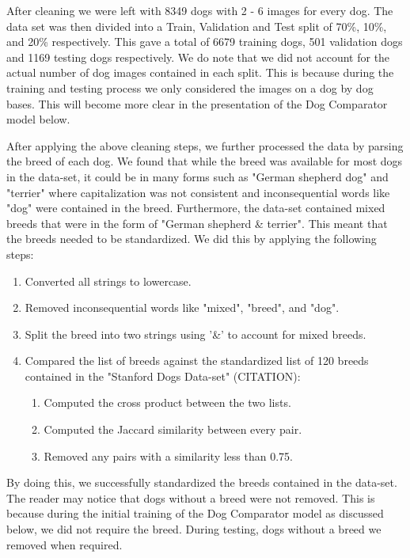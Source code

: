 \documentclass{article}
\begin{document}
\noindent After cleaning we were left with 8349 dogs with 2 - 6 images for every dog.  The data set was then divided into a Train, Validation and Test split of 70\%, 10\%, and 20\% respectively.  This gave a total of 6679 training dogs, 501 validation dogs and 1169 testing dogs respectively.  We do note that we did not account for the actual number of dog images contained in each split.  This is because during the training and testing process we only considered the images on a dog by dog bases.  This will become more clear in the presentation of the Dog Comparator model below.

After applying the above cleaning steps, we further processed the data by parsing the breed of each dog.  We found that while the breed was available for most dogs in the data-set, it could be in many forms such as "German shepherd dog" and "terrier" where capitalization was not consistent and inconsequential words like "dog" were contained in the breed.  Furthermore, the data-set contained mixed breeds that were in the form of "German shepherd \& terrier".  This meant that the breeds needed to be standardized.  We did this by applying the following steps:

\begin{enumerate}
  \item Converted all strings to lowercase.
  
  \item Removed inconsequential words like "mixed", "breed", and "dog".
  
  \item Split the breed into two strings using '\&' to account for mixed breeds.
    
  \item Compared the list of breeds against the  standardized list of 120 breeds contained in the "Stanford Dogs Data-set" (CITATION):
    \begin{enumerate}
      \item Computed the cross product between the two lists.
      \item Computed the Jaccard similarity between every pair.
      \item Removed any pairs with a similarity less than 0.75.
    \end{enumerate}
\end{enumerate} 

\noindent By doing this, we successfully standardized the breeds contained in the data-set.  The reader may notice that dogs without a breed were not removed.  This is because during the initial training of the Dog Comparator model as discussed below, we did not require the breed.  During testing, dogs without a breed we removed when required.
\end{document}
